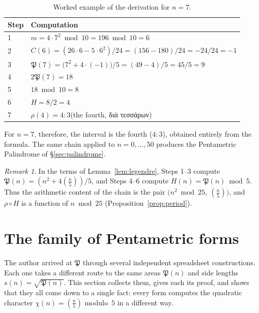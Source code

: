 \documentclass[11pt,a4paper]{article}
\newcommand{\gr}[1]{{\greekfont #1}}                 %
\newcommand{\Pent}{\mathfrak{P}}                      %
\newcommand{\leg}[1]{\left(\tfrac{#1}{5}\right)}      %
\theoremstyle{plain}
\theoremstyle{definition}
\theoremstyle{remark}
\newtheorem{remark}[theorem]{Remark}
\begin{document}
\begin{table}[ht]
\centering\small
\caption{Worked example of the derivation for $n=7$.}\label{tab:example7}
\renewcommand{\arraystretch}{1.25}
\begin{tabular}{@{}ll@{}}
\toprule
Step & Computation \\
\midrule
1 & $m=4\cdot7^{2}\bmod10=196\bmod10=6$ \\
2 & $C(6)=(26\cdot6-5\cdot6^{2})/24=(156-180)/24=-24/24=-1$ \\
3 & $\Pent(7)=\bigl(7^{2}+4\cdot(-1)\bigr)/5=(49-4)/5=45/5=9$ \\
4 & $2\Pent(7)=18$ \\
5 & $18\bmod10=8$ \\
6 & $H=8/2=4$ \\
7 & $\rho(4)=4:3$\quad (the fourth, \gr{διὰ τεσσάρων}) \\
\bottomrule
\end{tabular}
\end{table}

\noindent For $n=7$, therefore, the interval is the fourth ($4:3$), obtained entirely from the formula. The same chain applied to $n=0,\dots,50$ produces the Pentametric Palindrome of §\ref{sec:palindrome}.

\begin{remark}
In the terms of Lemma~\ref{lem:legendre}, Steps 1–3 compute $\Pent(n)=(n^{2}+4\leg{n})/5$, and Steps 4–6 compute $H(n)=\Pent(n)\bmod5$. Thus the arithmetic content of the chain is the pair $\bigl(n^{2}\bmod 25,\ \leg{n}\bigr)$, and $\rho\circ H$ is a function of $n\bmod 25$ (Proposition~\ref{prop:period}).
\end{remark}

\section{The family of Pentametric forms}\label{sec:family}

The author arrived at $\Pent$ through several independent spreadsheet constructions. Each one takes a different route to the same areas $\Pent(n)$ and side lengths $s(n)=\sqrt{\Pent(n)}$. This section collects them, gives each its proof, and shows that they all come down to a single fact: every form computes the quadratic character $\chi(n)=\leg{n}$ modulo~$5$ in a different way.
\end{document}
